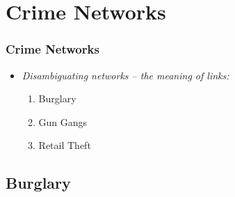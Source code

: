 \documentclass[pdftex]{beamer}
\begin{document}
\section{Crime Networks}

\begin{frame}
\frametitle{Crime Networks}
\begin{itemize}
\item {\emph{Disambiguating networks -- the meaning of links:}}\newline
\begin{enumerate}
\item Burglary\newline
\item Gun Gangs\newline
\item Retail Theft\newline
\end{enumerate}
\end{itemize}
\end{frame}

\subsection{Burglary}

{ %
    \begin{frame}[plain]
     \end{frame}
}
\end{document}
